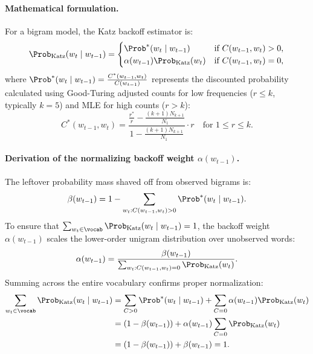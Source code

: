 \documentclass[../../main.tex]{subfiles}
\begin{document}
\paragraph{Mathematical formulation.}
For a bigram model, the Katz backoff estimator is:
\begin{equation}
\label{eq:katz_backoff}
\Prob_{\text{Katz}}(w_t \mid w_{t-1}) = \begin{cases}
\Prob^*(w_t \mid w_{t-1}) & \text{if } C(w_{t-1}, w_t) > 0, \\
\alpha(w_{t-1}) \Prob_{\text{Katz}}(w_t) & \text{if } C(w_{t-1}, w_t) = 0,
\end{cases}
\end{equation}
where $\Prob^*(w_t \mid w_{t-1}) = \frac{C^*(w_{t-1}, w_t)}{C(w_{t-1})}$ represents the discounted probability calculated using Good-Turing adjusted counts for low frequencies ($r \le k$, typically $k = 5$) and MLE for high counts ($r > k$):
\begin{equation}
\label{eq:katz_cstar}
C^*(w_{t-1}, w_t) = \frac{\frac{r^*}{r} - \frac{(k+1)N_{k+1}}{N_1}}{1 - \frac{(k+1)N_{k+1}}{N_1}} \cdot r \quad \text{for } 1 \le r \le k.
\end{equation}

\paragraph{Derivation of the normalizing backoff weight $\alpha(w_{t-1})$.}
The leftover probability mass shaved off from observed bigrams is:
\begin{equation}
\label{eq:katz_beta}
\beta(w_{t-1}) = 1 - \sum_{w_t : C(w_{t-1}, w_t) > 0} \Prob^*(w_t \mid w_{t-1}).
\end{equation}
To ensure that $\sum_{w_t \in \vocab} \Prob_{\text{Katz}}(w_t \mid w_{t-1}) = 1$, the backoff weight $\alpha(w_{t-1})$ scales the lower-order unigram distribution over unobserved words:
\begin{equation}
\label{eq:katz_alpha}
\alpha(w_{t-1}) = \frac{\beta(w_{t-1})}{\sum_{w_t : C(w_{t-1}, w_t) = 0} \Prob_{\text{Katz}}(w_t)}.
\end{equation}
Summing across the entire vocabulary confirms proper normalization:
\begin{align}
\sum_{w_t \in \vocab} \Prob_{\text{Katz}}(w_t \mid w_{t-1}) &= \sum_{C > 0} \Prob^*(w_t \mid w_{t-1}) + \sum_{C = 0} \alpha(w_{t-1}) \Prob_{\text{Katz}}(w_t) \notag \\
&= \left( 1 - \beta(w_{t-1}) \right) + \alpha(w_{t-1}) \sum_{C = 0} \Prob_{\text{Katz}}(w_t) \notag \\
&= \left( 1 - \beta(w_{t-1}) \right) + \beta(w_{t-1}) = 1. \label{eq:katz_proof}
\end{align}
\end{document}
